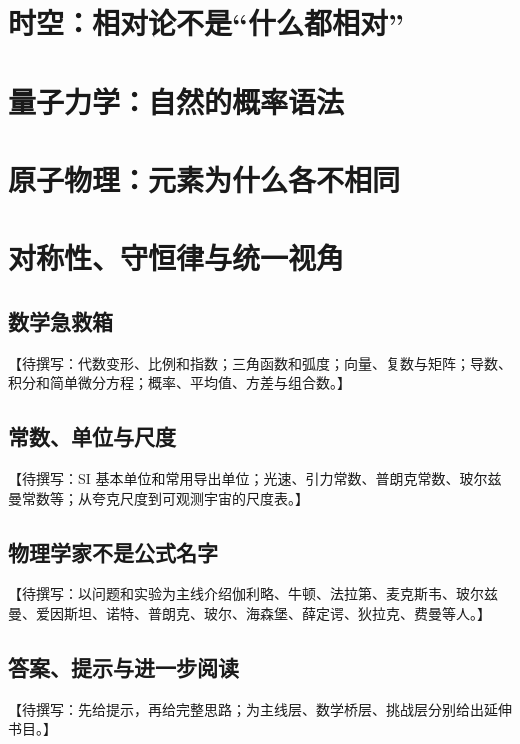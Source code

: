 \documentclass[fontset=fandol,12pt,openany]{ctexbook}
\begin{document}
\part{时空：相对论不是“什么都相对”}




\part{量子力学：自然的概率语法}









\part{原子物理：元素为什么各不相同}






\part{对称性、守恒律与统一视角}






\backmatter
\chapter{数学急救箱}
【待撰写：代数变形、比例和指数；三角函数和弧度；向量、复数与矩阵；导数、积分和简单微分方程；概率、平均值、方差与组合数。】
\chapter{常数、单位与尺度}
【待撰写：SI 基本单位和常用导出单位；光速、引力常数、普朗克常数、玻尔兹曼常数等；从夸克尺度到可观测宇宙的尺度表。】
\chapter{物理学家不是公式名字}
【待撰写：以问题和实验为主线介绍伽利略、牛顿、法拉第、麦克斯韦、玻尔兹曼、爱因斯坦、诺特、普朗克、玻尔、海森堡、薛定谔、狄拉克、费曼等人。】
\chapter{答案、提示与进一步阅读}
【待撰写：先给提示，再给完整思路；为主线层、数学桥层、挑战层分别给出延伸书目。】
\end{document}
